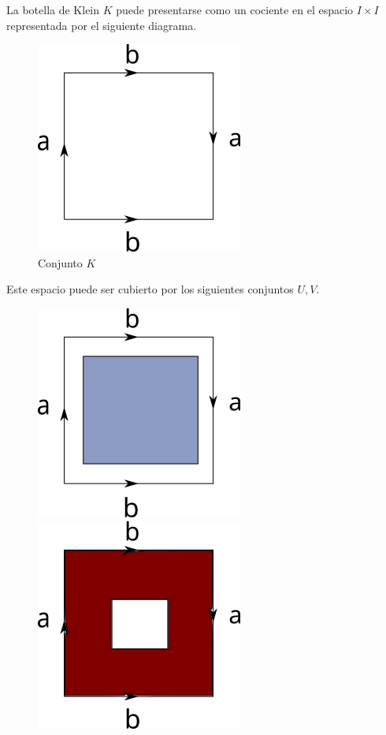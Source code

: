 \begin{ejemplo}
  La botella de Klein \(K\) puede presentarse como un cociente en el
  espacio \(I \times I\) representada por el siguiente diagrama.
  \begin{figure}[h]
    \centering \includegraphics[scale=0.5]{./imagenes/klein.png}
    \caption*{Conjunto \(K\)}
  \end{figure}
  Este espacio puede ser cubierto por los siguientes conjuntos \(U,V\).
  \begin{figure}[h]
    \centering
    \includegraphics[scale=0.5]{./imagenes/kleinU.png}
    \hspace{3mm}
    \includegraphics[scale=0.5]{./imagenes/kleinV.png}

\end{figure}
\end{ejemplo}
